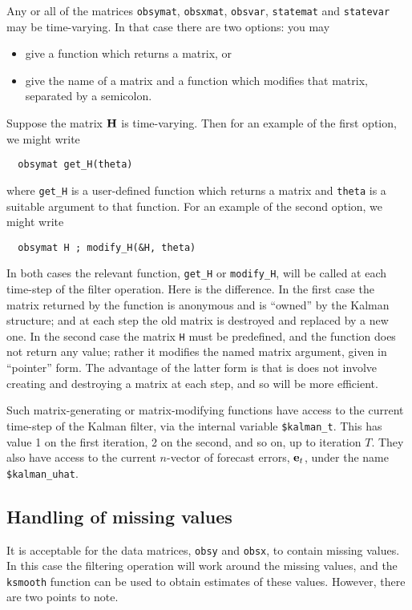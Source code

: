 \documentclass[a4paper]{article}
\newcommand{\obsmat}{\ensuremath\mathbf{H}}
\newcommand{\prederr}{\ensuremath\mathbf{e}}
\begin{document}
Any or all of the matrices \texttt{obsymat}, \texttt{obsxmat},
\texttt{obsvar}, \texttt{statemat} and \texttt{statevar} may be
time-varying.  In that case there are two options: you may

\begin{itemize}
\item give a function which returns a matrix, or
\item give the name of a matrix and a function which modifies that
  matrix, separated by a semicolon.
\end{itemize}

Suppose the matrix $\obsmat$ is time-varying.  Then for an example of
the first option, we might write
%
\begin{verbatim}
  obsymat get_H(theta)
\end{verbatim}
%
where \texttt{get\_H} is a user-defined function which returns a
matrix and \texttt{theta} is a suitable argument to that function.
For an example of the second option, we might write
%
\begin{verbatim}
  obsymat H ; modify_H(&H, theta)
\end{verbatim}

In both cases the relevant function, \verb+get_H+ or \verb+modify_H+,
will be called at each time-step of the filter operation.  Here is the
difference. In the first case the matrix returned by the function is
anonymous and is ``owned'' by the Kalman structure; and at each step
the old matrix is destroyed and replaced by a new one.  In the second
case the matrix \texttt{H} must be predefined, and the function does
not return any value; rather it modifies the named matrix argument,
given in ``pointer'' form.  The advantage of the latter form is that
is does not involve creating and destroying a matrix at each step, and
so will be more efficient.

Such matrix-generating or matrix-modifying functions have access to
the current time-step of the Kalman filter, via the internal variable
\verb+$kalman_t+.  This has value 1 on the first iteration, 2 on the
second, and so on, up to iteration $T$.  They also have access to
the current $n$-vector of forecast errors, $\prederr_t$, under the
name \verb+$kalman_uhat+.


\subsection{Handling of missing values}

It is acceptable for the data matrices, \texttt{obsy} and
\texttt{obsx}, to contain missing values.  In this case the filtering
operation will work around the missing values, and the \texttt{ksmooth}
function can be used to obtain estimates of these values.  However,
there are two points to note.
\end{document}
